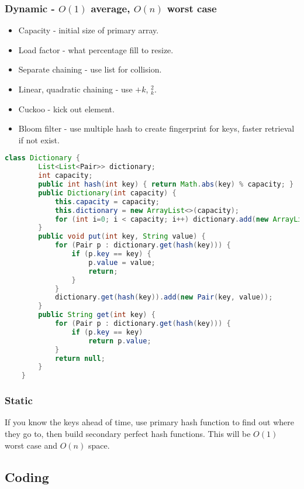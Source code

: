 \documentclass{article}
\begin{document}
\subsubsection{Dynamic - $O(1)$ average, $O(n)$ worst case}
\begin{itemize}
    \item Capacity - initial size of primary array.
    \item Load factor - what percentage fill to resize.
    \item Separate chaining - use list for collision.
    \item Linear, quadratic chaining - use $+k$, $_k^2$.
    \item Cuckoo - kick out element.
    \item Bloom filter - use multiple hash to create fingerprint for keys, faster retrieval if not exist.
\end{itemize}
\begin{lstlisting}[language=java]
    class Dictionary {
        List<List<Pair>> dictionary;
        int capacity;
        public int hash(int key) { return Math.abs(key) % capacity; }
        public Dictionary(int capacity) {
            this.capacity = capacity;
            this.dictionary = new ArrayList<>(capacity);
            for (int i=0; i < capacity; i++) dictionary.add(new ArrayList<Pair>());
        }
        public void put(int key, String value) {
            for (Pair p : dictionary.get(hash(key))) {
                if (p.key == key) {
                    p.value = value;
                    return;
                }
            }
            dictionary.get(hash(key)).add(new Pair(key, value));
        }
        public String get(int key) {
            for (Pair p : dictionary.get(hash(key))) {
                if (p.key == key)
                    return p.value;
            }
            return null;
        }
    }
\end{lstlisting}

\subsubsection{Static}
If you know the keys ahead of time, use primary hash function to find out where they go to, then build secondary perfect hash functions. This will be $O(1)$ worst case and $O(n)$ space.

\subsection{Coding}
\end{document}
